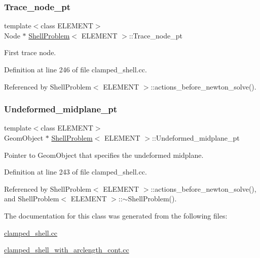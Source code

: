 \subsubsection{\texorpdfstring{Trace\+\_\+node\+\_\+pt}{Trace\_node\_pt}}
{\footnotesize\ttfamily template$<$class E\+L\+E\+M\+E\+NT$>$ \\
Node $\ast$ \hyperlink{classShellProblem}{Shell\+Problem}$<$ E\+L\+E\+M\+E\+NT $>$\+::Trace\+\_\+node\+\_\+pt\hspace{0.3cm}{\ttfamily [private]}}



First trace node. 



Definition at line 246 of file clamped\+\_\+shell.\+cc.



Referenced by Shell\+Problem$<$ E\+L\+E\+M\+E\+N\+T $>$\+::actions\+\_\+before\+\_\+newton\+\_\+solve().

\mbox{\label{classShellProblem_a1c9e4492c7c7c2716fdf8b812ec41651}} 
\subsubsection{\texorpdfstring{Undeformed\+\_\+midplane\+\_\+pt}{Undeformed\_midplane\_pt}}
{\footnotesize\ttfamily template$<$class E\+L\+E\+M\+E\+NT$>$ \\
Geom\+Object $\ast$ \hyperlink{classShellProblem}{Shell\+Problem}$<$ E\+L\+E\+M\+E\+NT $>$\+::Undeformed\+\_\+midplane\+\_\+pt\hspace{0.3cm}{\ttfamily [private]}}



Pointer to Geom\+Object that specifies the undeformed midplane. 



Definition at line 243 of file clamped\+\_\+shell.\+cc.



Referenced by Shell\+Problem$<$ E\+L\+E\+M\+E\+N\+T $>$\+::actions\+\_\+before\+\_\+newton\+\_\+solve(), and Shell\+Problem$<$ E\+L\+E\+M\+E\+N\+T $>$\+::$\sim$\+Shell\+Problem().



The documentation for this class was generated from the following files\+:\begin{DoxyCompactItemize}
\item 
\hyperlink{clamped__shell_8cc}{clamped\+\_\+shell.\+cc}\item 
\hyperlink{clamped__shell__with__arclength__cont_8cc}{clamped\+\_\+shell\+\_\+with\+\_\+arclength\+\_\+cont.\+cc}\end{DoxyCompactItemize}
